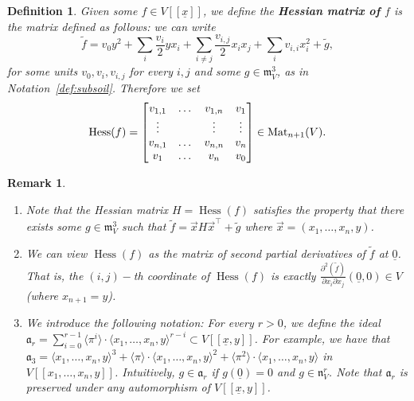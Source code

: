 \documentclass{article}
\newtheorem{definition}[theorem]{Definition}
\newtheorem{remark}[theorem]{Remark}
\DeclareMathOperator{\Hess}{Hess}
\newcommand{\maxV}{\mathfrak{m}_V}
\newcommand{\naxV}{\mathfrak{n}_V}
\numberwithin{theorem}{section}
\begin{document}
\begin{definition}\label{def:hessian}
    Given some $f \in V[[\underline{x}]]$, we define the \textbf{Hessian matrix of $f$} is the matrix defined as follows: we can write 
    \begin{equation*}
        \tilde{f}=v_0y^2+\sum_i \frac{v_i}{2} yx_i + \sum_{i \neq j} \frac{v_{i,j}}{2} x_i x_j + \sum_iv_{i,i}x_i^2 + \tilde{g},
    \end{equation*}
    \noindent for some units $v_0 , v_i, v_{i,j}$ for every $i,j$ and some $g \in \maxV^3$, as in Notation~\ref{def:subsoil}. Therefore we set
    \begin{equation*}
         \Hess(f) =
        \begin{bmatrix}
            v_{1,1} & \dots & v_{1, n} & v_1\\
            \vdots &  & \vdots  & \vdots \\
            v_{n,1} & \dots & v_{n,n} & v_n\\
            v_1 & \dots & v_n & v_0
        \end{bmatrix}
        \in \textup{Mat}_{n+1}(V).
    \end{equation*}
\end{definition}

\begin{remark}\label{rem:Hessian}
    \begin{enumerate}
        \item \textup{Note that the Hessian matrix $H=\Hess(f)$ satisfies the property that there exists some $g \in \maxV^3$ such that $\tilde{f}=\vec{x}H \vec{x}^\intercal +\tilde{g}$ where $\vec{x}=(x_1, \dots, x_n, y)$. } 
        \item \textup{We can view $ \Hess(f)$ as the matrix of second partial derivatives of $\tilde{f}$ at $\underline{0}$. That is, the $(i,j)-$th coordinate of $\Hess(f)$ is exactly $\frac{\partial^2(\tilde{f})}{ \partial x_i \partial x_j} (\underline{0},0) \in V$ (where $x_{n+1}=y$).  }
        \item \textup{We introduce the following notation: For every $r >0$, we define the ideal $\mathfrak{a}_r=\sum_{i=0}^{r-1} \langle \pi^i\rangle \cdot \langle x_1, \dots, x_n,y\rangle^{r-i} \subset V[[\underline{x},y]]$. For example, we have that  $\mathfrak{a}_3= \langle x_1, \dots, x_n, y \rangle^3 + \langle \pi \rangle \cdot \langle x_1, \dots, x_n, y \rangle^2 + \langle \pi^2 \rangle \cdot \langle x_1, \dots, x_n, y \rangle$ in $V[[ x_1, \dots, x_n, y ]]$. Intuitively, $g \in \mathfrak{a}_r$ if $g(\underline{0})=0$ and $g \in \naxV^r$. Note that $\mathfrak{a}_r$ is preserved under any automorphism of $V[[\underline{x},y]]$.} 
    \end{enumerate}
\end{remark}
\end{document}
